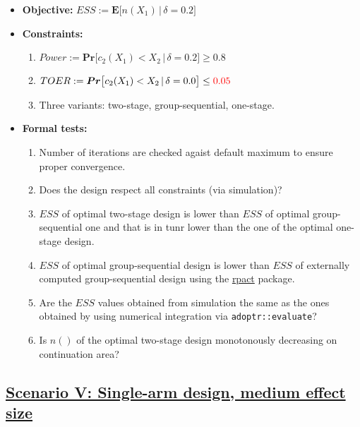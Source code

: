 \documentclass[]{book}
\providecommand{\tightlist}{%
  \setlength{\itemsep}{0pt}\setlength{\parskip}{0pt}}
\begin{document}
\begin{itemize}
\tightlist
\item
  \textbf{Objective:} \(ESS := \boldsymbol{E}\big[n(X_1)\,|\,\delta=0.2\big]\)
\item
  \textbf{Constraints:}

  \begin{enumerate}
  \def\labelenumi{\arabic{enumi}.}
  \tightlist
  \item
    \(Power := \boldsymbol{Pr}\big[c_2(X_1) < X_2\,|\,\delta=0.2\big] \geq 0.8\)
  \item
    \(TOER := \boldsymbol{Pr}\big[c_2(X_1) < X_2\,|\,\delta=0.0\big] \leq \color{red}{0.05}\)
  \item
    Three variants: two-stage, group-sequential, one-stage.
  \end{enumerate}
\item
  \textbf{Formal tests:}

  \begin{enumerate}
  \def\labelenumi{\arabic{enumi}.}
  \tightlist
  \item
    Number of iterations are checked agaist default maximum to ensure proper
    convergence.
  \item
    Does the design respect all constraints (via simulation)?
  \item
    \(ESS\) of optimal two-stage design is lower than \(ESS\) of optimal
    group-sequential one and that is in tunr lower than the one of the
    optimal one-stage design.
  \item
    \(ESS\) of optimal group-sequential design is lower than \(ESS\) of
    externally computed group-sequential design using the \href{https://rpact.org/}{rpact} package.
  \item
    Are the \(ESS\) values obtained from simulation the same as the ones
    obtained by using numerical integration via \texttt{adoptr::evaluate}?
  \item
    Is \(n()\) of the optimal two-stage design monotonously decreasing on
    continuation area?
  \end{enumerate}
\end{itemize}

\hypertarget{scenario-v-single-arm-design-medium-effect-size}{%
\subsection{\texorpdfstring{\protect\hyperlink{scenarioV}{Scenario V: Single-arm design, medium effect size}}{Scenario V: Single-arm design, medium effect size}}\label{scenario-v-single-arm-design-medium-effect-size}}
\end{document}
